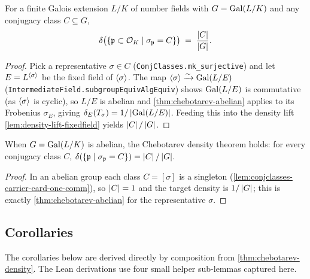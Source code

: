 \begin{theorem}\label{thm:chebotarev-density}
  For a finite Galois extension $L/K$ of number fields with
  $G=\mathrm{Gal}(L/K)$ and any conjugacy class $C\subseteq G$,
  \[
    \delta\bigl(\left\{ \mathfrak{p}\subset\mathcal{O}_K \;\middle|\; \sigma_{\mathfrak{p}} = C \right\}\bigr)
    \;=\; \frac{\left\lvert C \right\rvert}{\left\lvert G \right\rvert}.
  \]
\end{theorem}

\begin{proof}
  \leanok
  Pick a representative $\sigma\in C$ (\texttt{ConjClasses.mk\_surjective})
  and let $E = L^{\left\langle \sigma \right\rangle}$ be the fixed field of $\left\langle \sigma \right\rangle$. The map
  $\left\langle \sigma \right\rangle \xrightarrow{\sim} \mathrm{Gal}(L/E)$
  (\texttt{IntermediateField.subgroupEquivAlgEquiv}) shows $\mathrm{Gal}(L/E)$ is
  commutative (as $\left\langle \sigma \right\rangle$ is cyclic), so $L/E$ is abelian and
  \cref{thm:chebotarev-abelian} applies to its Frobenius $\sigma_E$, giving
  $\delta_E(T_\sigma) = 1/\left\lvert \mathrm{Gal}(L/E) \right\rvert$. Feeding this into the density
  lift \cref{lem:density-lift-fixedfield} yields $\left\lvert C \right\rvert/\left\lvert G \right\rvert$.
\end{proof}

\begin{theorem}\label{thm:chebotarev-density-comm}
  When $G = \mathrm{Gal}(L/K)$ is abelian, the Chebotarev density theorem holds:
  for every conjugacy class $C$,
  $\delta(\left\{ \mathfrak{p} \;\middle|\; \sigma_{\mathfrak{p}} = C \right\}) = \left\lvert C \right\rvert/\left\lvert G \right\rvert$.
\end{theorem}

\begin{proof}
  \leanok
  In an abelian group each class $C = [\sigma]$ is a singleton
  (\cref{lem:conjclasses-carrier-card-one-comm}), so $\left\lvert C \right\rvert = 1$ and
  the target density is $1/\left\lvert G \right\rvert$; this is exactly
  \cref{thm:chebotarev-abelian} for the representative $\sigma$.
\end{proof}

\subsection*{Corollaries}

The corollaries below are derived directly by composition from
\cref{thm:chebotarev-density}. The Lean derivations use four small
helper sub-lemmas captured here.


